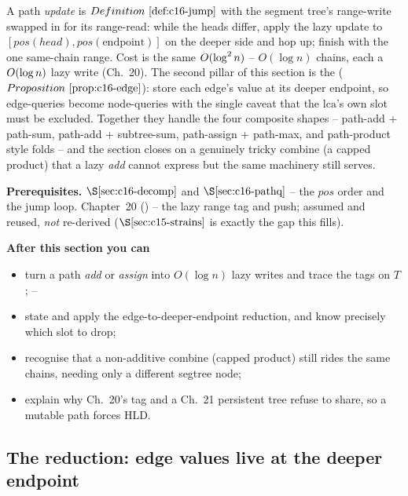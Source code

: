 \begin{topicintro}
A path \emph{update} is \(\defref{c16-jump}\) with the segment tree's range-write swapped in for its range-read: while the heads differ, apply the lazy update to \([\mathit{pos}(\mathit{head}),\mathit{pos}(\text{endpoint})]\) on the deeper side and hop up; finish with the one same-chain range.  Cost is the same \(O(\log^2 n)\) -- \(O(\log n)\) chains, each a \(O(\log n)\) lazy write (Ch.~20).  The second pillar of this section is the  (\(\propref{c16-edge}\)): store each edge's value at its deeper endpoint, so edge-queries become node-queries with the single caveat that the \(\mathrm{lca}\)'s own slot must be excluded.  Together they handle the four composite shapes -- path-add + path-sum, path-add + subtree-sum, path-assign + path-max, and path-product style folds -- and the section closes on a genuinely tricky combine (a capped product) that a lazy \emph{add} cannot express but the same machinery still serves.

\textbf{Prerequisites.} \(\secref{c16-decomp}\) and \(\secref{c16-pathq}\) -- the \(\mathit{pos}\) order and the jump loop.  Chapter~20 () -- the lazy range tag and push; assumed and reused, \emph{not} re-derived (\(\secref{c15-strains}\) is exactly the gap this fills).

\textbf{After this section you can}
\begin{itemize}[nosep]
  \item turn a path \emph{add} or \emph{assign} into \(O(\log n)\) lazy writes and trace the tags on \(T\); \hfill{}--
  \item state and apply the edge-to-deeper-endpoint reduction, and know precisely which slot to drop; \hfill{}
  \item recognise that a non-additive combine (capped product) still rides the same chains, needing only a different segtree node; \hfill{}
  \item explain why Ch.~20's tag and a Ch.~21 persistent tree refuse to share, so a mutable path forces HLD. \hfill{}
\end{itemize}
\end{topicintro}

\subsection{The reduction: edge values live at the deeper endpoint}

